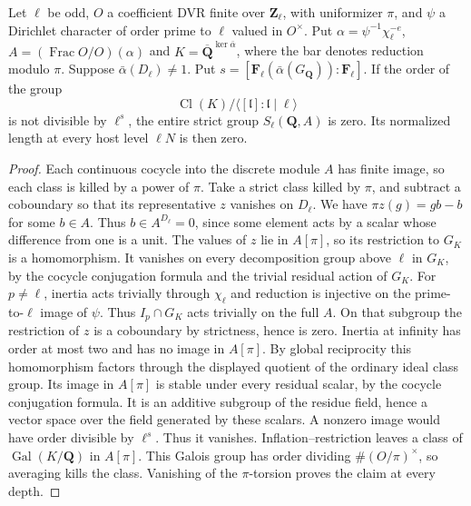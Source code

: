 \begin{proposition}\label{famsel:class}
Let \(\ell\) be odd, \(O\) a coefficient DVR finite over
\(\mathbf Z_\ell\), with uniformizer \(\pi\), and \(\psi\) a Dirichlet
character of order prime to \(\ell\) valued in \(O^\times\).
Put \(\alpha=\psi^{-1}\chi_\ell^{-e}\),
\(A=(\operatorname{Frac}O/O)(\alpha)\) and
\(K=\overline{\mathbf Q}^{\ker\bar\alpha}\), where the bar denotes
reduction modulo \(\pi\). Suppose \(\bar\alpha(D_\ell)\ne1\).
Put \(s=[\mathbf F_\ell(\bar\alpha(G_{\mathbf Q})):\mathbf F_\ell]\).
If the order of the group
\[
        \operatorname{Cl}(K)/\langle[\mathfrak l]:\mathfrak l\mid\ell\rangle
\]
is not divisible by \(\ell^s\), the entire strict group
\(S_\ell(\mathbf Q,A)\) is zero. Its normalized length at every host
level \(\ell N\) is then zero.
\end{proposition}
\begin{proof}
Each continuous cocycle into the discrete module \(A\) has finite
image, so each class is killed by a power of \(\pi\). Take a strict
class killed by \(\pi\), and subtract a coboundary so that its
representative \(z\) vanishes on \(D_\ell\).
We have \(\pi z(g)=g b-b\) for some \(b\in A\). Thus
\(b\in A^{D_\ell}=0\), since some element acts by a scalar whose
difference from one is a unit. The values of \(z\) lie in \(A[\pi]\),
so its restriction to \(G_K\) is a homomorphism. It vanishes on
every decomposition group above \(\ell\) in \(G_K\), by the cocycle
conjugation formula and the trivial residual action of \(G_K\).
For \(p\ne\ell\), inertia acts trivially through \(\chi_\ell\) and
reduction is injective on the prime-to-\(\ell\) image of \(\psi\).
Thus \(I_p\cap G_K\) acts trivially on the full \(A\). On that
subgroup the restriction of \(z\) is a coboundary by strictness,
hence is zero. Inertia at infinity has order at most two and has no
image in \(A[\pi]\). By global reciprocity this homomorphism
factors through the displayed quotient of the ordinary ideal class
group. Its image in \(A[\pi]\) is stable under every residual scalar,
by the cocycle conjugation formula. It is an additive subgroup of
the residue field, hence a vector space over the field generated by
these scalars. A nonzero image would have order divisible by \(\ell^s\).
Thus it vanishes. Inflation--restriction leaves a class of
\(\operatorname{Gal}(K/\mathbf Q)\) in \(A[\pi]\). This Galois
group has order dividing \(\#(O/\pi)^\times\), so averaging kills
the class. Vanishing of the \(\pi\)-torsion proves the claim at every depth.
\end{proof}

